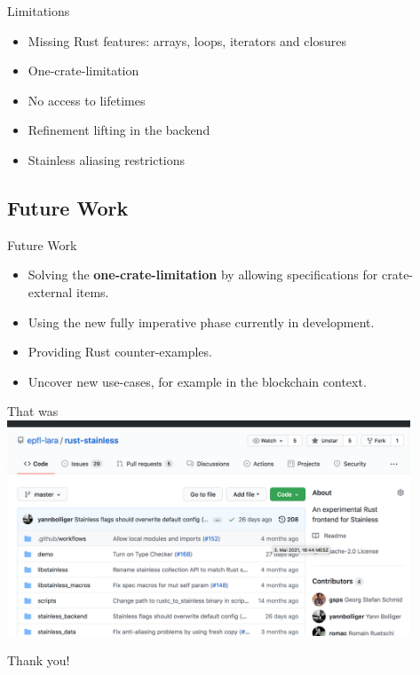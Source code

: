 \begin{frame}[fragile]{Limitations}
\begin{itemize}
\item Missing Rust features: arrays, loops, iterators and closures
\item One-crate-limitation
\item No access to lifetimes
\item Refinement lifting in the backend
\item Stainless aliasing restrictions
\end{itemize}
\end{frame}

\subsection{Future Work}

\begin{frame}{Future Work}
\begin{itemize}
  \item Solving the \textbf{one-crate-limitation} by allowing specifications
  for crate-external items.

  \item Using the new fully imperative phase currently in development.

  \item Providing Rust counter-examples.

  \item Uncover new use-cases, for example in the blockchain context.
\end{itemize}
\end{frame}

\begin{frame}{That was}
\centering
\includegraphics[width=0.9\textwidth]{img/github.png}
\end{frame}

\begin{frame}[standout]
Thank you!
\end{frame}

